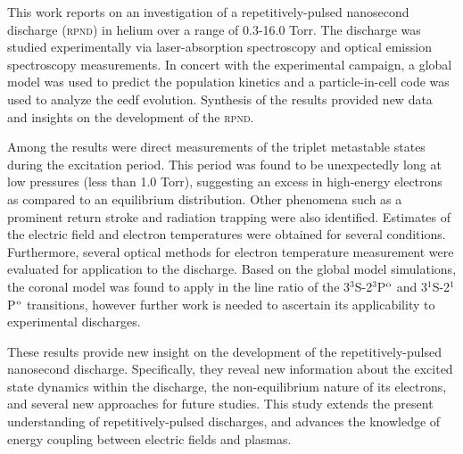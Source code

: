 \indent This work reports on an investigation of a repetitively-pulsed nanosecond
discharge (\textsc{rpnd}) in helium over a range of 0.3-16.0 Torr. The discharge
was studied experimentally via laser-absorption spectroscopy and optical
emission spectroscopy measurements. In concert with the experimental campaign, a
global model was used to predict the population kinetics and a particle-in-cell
code was used to analyze the \acs{eedf} evolution. Synthesis of the results
provided new data and insights on the development of the \textsc{rpnd}.

\indent Among the results were direct measurements of the triplet metastable states
during the excitation period. This period was found to be unexpectedly long at
low pressures (less than 1.0 Torr), suggesting an excess in high-energy
electrons as compared to an equilibrium distribution. Other phenomena such as a
prominent return stroke and radiation trapping were also identified. Estimates
of the electric field and electron temperatures were obtained for several
conditions. Furthermore, several optical methods for electron temperature
measurement were evaluated for application to the discharge. Based on the global
model simulations, the coronal model was found to apply in the line ratio of the
3$^3$S-2$^3$P$^\mathrm{o}$ and 3$^1$S-2$^1$P$^\mathrm{o}$ transitions, however further work is
needed to ascertain its applicability to experimental discharges.

\indent These results provide new insight on the development of the repetitively-pulsed
nanosecond discharge. Specifically, they reveal new information about the
excited state dynamics within the discharge, the non-equilibrium nature of its
electrons, and several new approaches for future studies. This study extends the
present understanding of repetitively-pulsed discharges, and advances the
knowledge of energy coupling between electric fields and plasmas.

